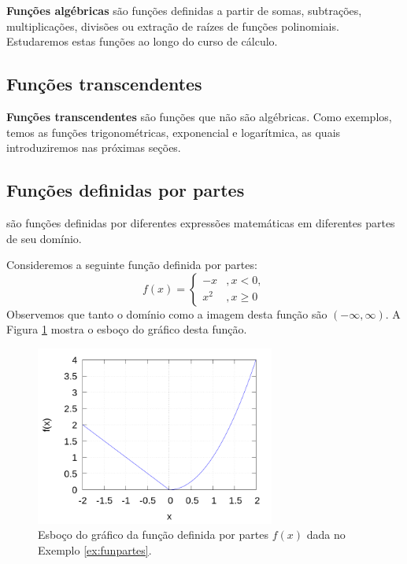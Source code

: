 {\bf Funções algébricas} são funções definidas a partir de somas, subtrações, multiplicações, divisões ou extração de raízes de funções polinomiais. Estudaremos estas funções ao longo do curso de cálculo.

\subsection{Funções transcendentes}

{\bf Funções transcendentes}{} são funções que não são algébricas. Como exemplos, temos as funções trigonométricas, exponencial e logarítmica, as quais introduziremos nas próximas seções.

\subsection{Funções definidas por partes}

 são funções definidas por diferentes expressões matemáticas em diferentes partes de seu domínio.

\begin{ex}\label{ex:funpartes}
  Consideremos a seguinte função definida por partes:
  \begin{equation}
    f(x) = \left\{
      \begin{array}{ll}
        -x &, x<0,\\
        x^2 &, x\geq0
      \end{array}
\right.
\end{equation}
Observemos que tanto o domínio como a imagem desta função são $(-\infty, \infty)$. A Figura \ref{fig:ex_funpartes} mostra o esboço do gráfico desta função.

\begin{figure}[H]
  \centering
  \includegraphics[width=0.7\textwidth]{./cap_funcao/dados/fig_ex_funpartes/fig_ex_funpartes}
  \caption{Esboço do gráfico da função definida por partes $f(x)$ dada no Exemplo \ref{ex:funpartes}.}
  \label{fig:ex_funpartes}
\end{figure}
\end{ex}

